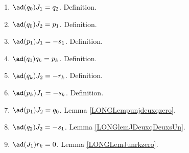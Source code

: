 \begin{enumerate}
	\item$\ad(q_0)J_1=q_2$. Definition.
	\item$\ad(q_0)J_2=p_1$. Definition.
	\item$\ad(p_1)J_1=-s_1$. Definition.
	\item$\ad(q_0)q_k=p_k$\label{LONGItemComqzpk}. Definition.
	\item$\ad(q_k)J_2=-r_k$. Definition.
	\item$\ad(p_k)J_1=-s_k$\label{LONGItemCompkJun}. Definition.
	\item$\ad(p_1)J_2=q_0$\label{LONGItemCompunJdeux}. Lemma \ref{LONGLempunjdeuxqzero}.
	\item$\ad(q_2)J_2=-s_1$. Lemma \ref{LONGlemJDeuxqDeuxsUn}.
	\item$\ad(J_1)r_k=0$\label{LONGItemComJunrk}. Lemma \ref{LONGLemJunrkzero}.
	

\end{enumerate}
